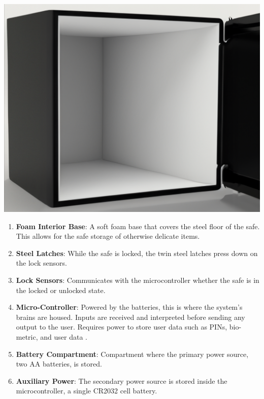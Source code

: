 \documentclass{article}
\begin{document}
\vspace{0.3cm}

\begin{center}
\includegraphics[scale=0.55]{docs/figs/open_safe.png}
\end{center}

\begin{enumerate}
    \item \textbf{Foam Interior Base}: A soft foam base that covers the steel floor of the safe. This allows for the safe storage of otherwise delicate items.
    \item \textbf{Steel Latches}: While the safe is locked, the twin steel latches press down on the lock sensors.
    \item \textbf{Lock Sensors}: Communicates with the microcontroller whether the safe is in the locked or unlocked state.
    \item \textbf{Micro-Controller}: Powered by the batteries, this is where the system's brains are housed. Inputs are received and interpreted before sending any output to the user. Requires power to store user data such as PINs, bio-metric, and user data \cite{gridling2007introduction}.
    \item \textbf{Battery Compartment}: Compartment where the primary power source, two AA batteries, is stored.
    \item \textbf{Auxiliary Power}: The secondary power source is stored inside the microcontroller, a single CR2032 cell battery.
\end{enumerate}
\end{document}
